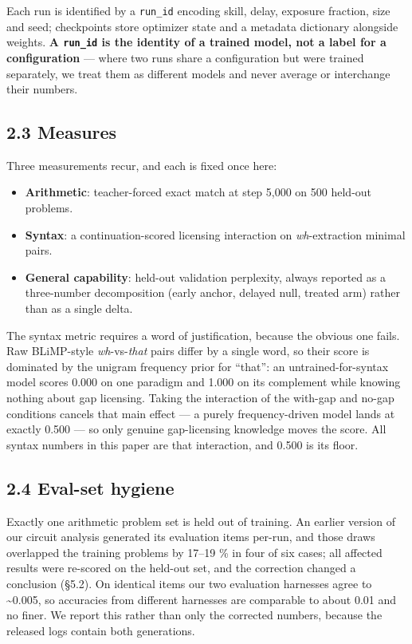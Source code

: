 \documentclass{article}
\providecommand{\tightlist}{\setlength{\itemsep}{0pt}\setlength{\parskip}{0pt}}
\begin{document}
Each run is identified by a \texttt{run\_id} encoding skill, delay, exposure fraction, size and seed;
checkpoints store optimizer state and a metadata dictionary alongside weights. \textbf{A \texttt{run\_id}
is the identity of a trained model, not a label for a configuration} --- where two runs share
a configuration but were trained separately, we treat them as different models and never
average or interchange their numbers.

\subsection{2.3 Measures}\label{measures}

Three measurements recur, and each is fixed once here:

\begin{itemize}
\tightlist
\item
  \textbf{Arithmetic}: teacher-forced exact match at step 5,000 on 500 held-out problems.
\item
  \textbf{Syntax}: a continuation-scored licensing interaction on \emph{wh}-extraction minimal pairs.
\item
  \textbf{General capability}: held-out validation perplexity, always reported as a three-number
  decomposition (early anchor, delayed null, treated arm) rather than as a single delta.
\end{itemize}

The syntax metric requires a word of justification, because the obvious one fails. Raw
BLiMP-style \emph{wh}-vs-\emph{that} pairs differ by a single word, so their score is dominated by the
unigram frequency prior for ``that'': an untrained-for-syntax model scores 0.000 on one
paradigm and 1.000 on its complement while knowing nothing about gap licensing. Taking the
interaction of the with-gap and no-gap conditions cancels that main effect --- a purely
frequency-driven model lands at exactly 0.500 --- so only genuine gap-licensing knowledge moves
the score. All syntax numbers in this paper are that interaction, and 0.500 is its floor.

\subsection{2.4 Eval-set hygiene}\label{eval-set-hygiene}

Exactly one arithmetic problem set is held out of training. An earlier version of our circuit
analysis generated its evaluation items per-run, and those draws overlapped the training
problems by 17--19 \% in four of six cases; all affected results were re-scored on the held-out
set, and the correction changed a conclusion (§5.2). On identical items our two evaluation
harnesses agree to \textasciitilde0.005, so accuracies from different harnesses are comparable to about
0.01 and no finer. We report this rather than only the corrected numbers, because the
released logs contain both generations.
\end{document}
